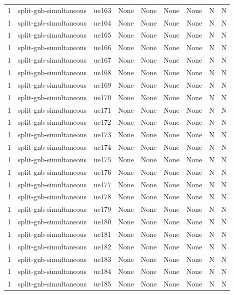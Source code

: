 \begin{table}[ht]
\begin{tabular}{|c|c|c|c|c|c|c|c|c|}
1 & split-gnb-simultaneous & ue163 & None & None & None & None & N & N \\
1 & split-gnb-simultaneous & ue164 & None & None & None & None & N & N \\
1 & split-gnb-simultaneous & ue165 & None & None & None & None & N & N \\
1 & split-gnb-simultaneous & ue166 & None & None & None & None & N & N \\
1 & split-gnb-simultaneous & ue167 & None & None & None & None & N & N \\
1 & split-gnb-simultaneous & ue168 & None & None & None & None & N & N \\
1 & split-gnb-simultaneous & ue169 & None & None & None & None & N & N \\
1 & split-gnb-simultaneous & ue170 & None & None & None & None & N & N \\
1 & split-gnb-simultaneous & ue171 & None & None & None & None & N & N \\
1 & split-gnb-simultaneous & ue172 & None & None & None & None & N & N \\
1 & split-gnb-simultaneous & ue173 & None & None & None & None & N & N \\
1 & split-gnb-simultaneous & ue174 & None & None & None & None & N & N \\
1 & split-gnb-simultaneous & ue175 & None & None & None & None & N & N \\
1 & split-gnb-simultaneous & ue176 & None & None & None & None & N & N \\
1 & split-gnb-simultaneous & ue177 & None & None & None & None & N & N \\
1 & split-gnb-simultaneous & ue178 & None & None & None & None & N & N \\
1 & split-gnb-simultaneous & ue179 & None & None & None & None & N & N \\
1 & split-gnb-simultaneous & ue180 & None & None & None & None & N & N \\
1 & split-gnb-simultaneous & ue181 & None & None & None & None & N & N \\
1 & split-gnb-simultaneous & ue182 & None & None & None & None & N & N \\
1 & split-gnb-simultaneous & ue183 & None & None & None & None & N & N \\
1 & split-gnb-simultaneous & ue184 & None & None & None & None & N & N \\
1 & split-gnb-simultaneous & ue185 & None & None & None & None & N & N \\

\end{tabular}
\end{table}
